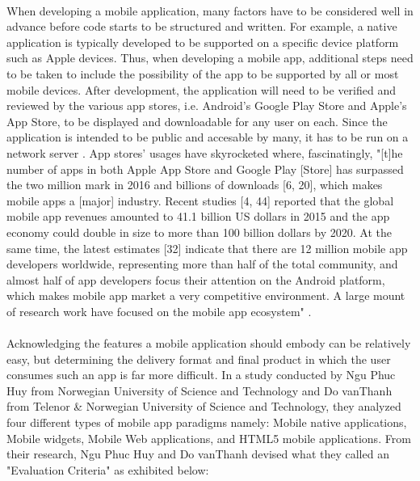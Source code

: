 \paragraph{}
When developing a mobile application, many factors have to be considered well in advance before code starts to be structured and written. For example, a native application is typically developed to be supported on a specific device platform such as Apple devices. Thus, when developing a mobile app, additional steps need to be taken to include the possibility of the app to be supported by all or most mobile devices. After development, the application will need to be verified and reviewed by the various app stores, i.e. Android's Google Play Store and Apple's App Store, to be displayed and downloadable for any user on each. Since the application is intended to be public and accesable by many, it has to be run on a network server \cite{Mobile_App_Paradigms}. App stores' usages have skyrocketed where, fascinatingly, "[t]he number of apps in both Apple App Store and Google Play [Store] has surpassed the two million mark in 2016 and billions of downloads [6, 20], which makes mobile apps a [major] industry. Recent studies [4, 44] reported that the global mobile app revenues amounted to 41.1 billion US dollars in 2015 and the app economy could double in size to more than 100 billion dollars by 2020. At the same time, the latest estimates [32] indicate that there are 12 million mobile app developers worldwide, representing more than half of the total community, and almost half of app developers focus their attention on the Android platform, which makes mobile app market a very competitive environment. A large mount of research work have focused on the mobile app ecosystem" \cite{Mobile_App_Ecosystem}.

\paragraph{}
Acknowledging the features a mobile application should embody can be relatively easy, but determining the delivery format and final product in which the user consumes such an app is far more difficult. In a study conducted by Ngu Phuc Huy from Norwegian University of Science and Technology and Do vanThanh from Telenor & Norwegian University of Science and Technology, they analyzed four different types of mobile app paradigms namely: Mobile native applications, Mobile widgets, Mobile Web applications, and HTML5 mobile applications. From their research, Ngu Phuc Huy and Do vanThanh devised what they called an "Evaluation Criteria" as exhibited below: \cite{Mobile_App_Paradigms}


